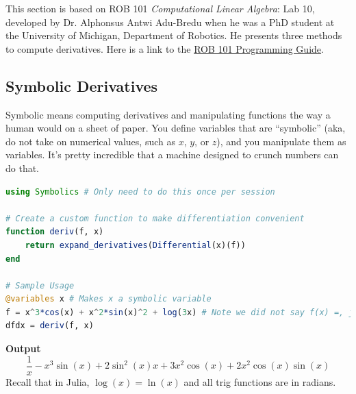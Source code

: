 This section is based on ROB 101 \textit{Computational Linear Algebra}: Lab 10, developed by Dr. Alphonsus Antwi Adu-Bredu when he was a PhD student at the University of Michigan, Department of Robotics. He presents three methods to compute derivatives. Here is a link to the \href{https://www.dropbox.com/s/lc4g6qqbnrb826n/ROB_101_Julia_Programming_Guide_31January2023.pdf?dl=0}{ROB 101 Programming Guide}.

\subsection{Symbolic Derivatives}
\label{sec:SymbolicDerivatives}

Symbolic means computing derivatives and manipulating functions the way a human would on a sheet of paper. You define variables that are ``symbolic'' (aka, do not take on numerical values, such as $x$, $y$, or $z$), and you manipulate them as variables. It's pretty incredible that a machine designed to crunch numbers can do that. \\

\begin{lstlisting}[language=Julia,style=mystyle]
using Symbolics # Only need to do this once per session

# Create a custom function to make differentiation convenient
function deriv(f, x)
    return expand_derivatives(Differential(x)(f))
end

# Sample Usage
@variables x # Makes x a symbolic variable
f = x^3*cos(x) + x^2*sin(x)^2 + log(3x) # Note we did not say f(x) =, just f = 
dfdx = deriv(f, x)
\end{lstlisting}
\textbf{Output} 
$$
\frac{1}{x} - x^{3} \sin\left( x \right) + 2 \sin^{2}\left( x \right) x + 3 x^{2} \cos\left( x \right) + 2 x^{2} \cos\left( x \right) \sin\left( x \right)
$$
Recall that in Julia, $\log(x) = \ln(x)$ and all trig functions are in radians. \\

